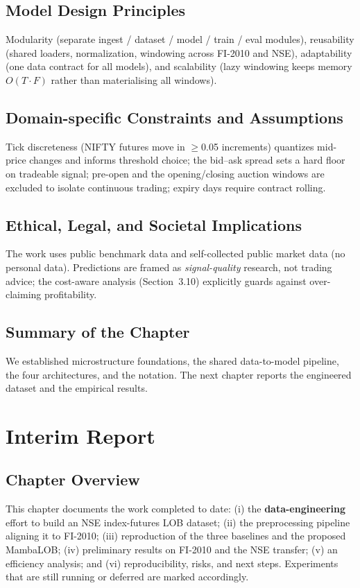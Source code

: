 \documentclass[11pt]{article}
\begin{document}
\subsection{Model Design Principles}
Modularity (separate ingest / dataset / model / train / eval modules), reusability (shared loaders,
normalization, windowing across FI-2010 and NSE), adaptability (one data contract for all models), and
scalability (lazy windowing keeps memory $O(T\cdot F)$ rather than materialising all windows).

\subsection{Domain-specific Constraints and Assumptions}
Tick discreteness (NIFTY futures move in $\geq$0.05 increments) quantizes mid-price changes and informs
threshold choice; the bid--ask spread sets a hard floor on tradeable signal; pre-open and the
opening/closing auction windows are excluded to isolate continuous trading; expiry days require contract
rolling.

\subsection{Ethical, Legal, and Societal Implications}
The work uses public benchmark data and self-collected public market data (no personal data). Predictions
are framed as \emph{signal-quality} research, not trading advice; the cost-aware analysis (Section~3.10)
explicitly guards against over-claiming profitability.

\subsection{Summary of the Chapter}
We established microstructure foundations, the shared data-to-model pipeline, the four architectures, and
the notation. The next chapter reports the engineered dataset and the empirical results.

\section{Interim Report}

\subsection{Chapter Overview}
This chapter documents the work completed to date: (i) the \textbf{data-engineering} effort to build an NSE
index-futures LOB dataset; (ii) the preprocessing pipeline aligning it to FI-2010; (iii) reproduction of
the three baselines and the proposed MambaLOB; (iv) preliminary results on FI-2010 and the NSE transfer;
(v) an efficiency analysis; and (vi) reproducibility, risks, and next steps. Experiments that are still
running or deferred are marked accordingly.
\end{document}
